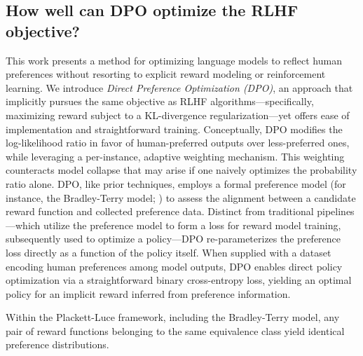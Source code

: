 \subsection{How well can DPO optimize the RLHF objective?}

This work presents a method for optimizing language models to reflect human preferences without resorting to explicit reward modeling or reinforcement learning. We introduce \textit{{Direct Preference Optimization} (DPO)}, an approach that implicitly pursues the same objective as RLHF algorithms—specifically, maximizing reward subject to a KL-divergence regularization—yet offers ease of implementation and straightforward training. Conceptually, DPO modifies the log-likelihood ratio in favor of human-preferred outputs over less-preferred ones, while leveraging a per-instance, adaptive weighting mechanism. This weighting counteracts model collapse that may arise if one naively optimizes the probability ratio alone. DPO, like prior techniques, employs a formal preference model (for instance, the Bradley-Terry model; \cite{bradley1952rankanalysis}) to assess the alignment between a candidate reward function and collected preference data. Distinct from traditional pipelines—which utilize the preference model to form a loss for reward model training, subsequently used to optimize a policy—DPO re-parameterizes the preference loss directly as a function of the policy itself. When supplied with a dataset encoding human preferences among model outputs, DPO enables direct policy optimization via a straightforward binary cross-entropy loss, yielding an optimal policy for an implicit reward inferred from preference information.

\begin{lemma}\label{lemma:same_prefrence}
Within the Plackett-Luce framework, including the Bradley-Terry model, any pair of reward functions belonging to the same equivalence class yield identical preference distributions.
\end{lemma}

